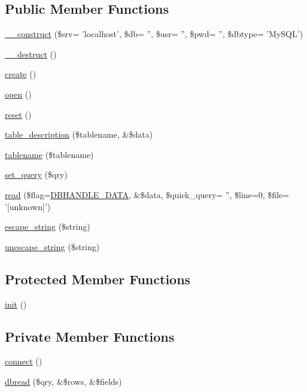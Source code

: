 \subsection*{Public Member Functions}
\begin{CompactItemize}
\item 
\hyperlink{classDbHandler_e54e9d4643f41a9296167086f6a769fc}{\_\-\_\-construct} (\$srv= 'localhost', \$db= '', \$usr= '', \$pwd= '', \$dbtype= 'MySQL')
\item 
\hyperlink{classDbHandler_7cd6bd727d1f296eb5dbfae6ca36ab3f}{\_\-\_\-destruct} ()
\item 
\hyperlink{classDbHandler_c9e93cb0ab57f03b2719eebd0c0ee2ef}{create} ()
\item 
\hyperlink{classDbHandler_fccbfc69ead84f8445116e050d1cfc2d}{open} ()
\item 
\hyperlink{classDbHandler_9982df4830f05803935bb31bac7fae3d}{reset} ()
\item 
\hyperlink{classDbHandler_00402b0e3e677108716714fbf94bea40}{table\_\-description} (\$tablename, \&\$data)
\item 
\hyperlink{classDbHandler_baca15a312800e5522b3efd9dff036f5}{tablename} (\$tablename)
\item 
\hyperlink{classDbHandler_305a3225c4760a88a06b0d55d0893962}{set\_\-query} (\$qry)
\item 
\hyperlink{classDbHandler_5ebfdc2acfcb0e9cbc2861fc55c7127c}{read} (\$flag=\hyperlink{class_8dbhandler_8php_cc5178c2a582eafa4ef488ed3394b725}{DBHANDLE\_\-DATA}, \&\$data, \$quick\_\-query= '', \$line=0, \$file= '\mbox{[}unknown\mbox{]}')
\item 
\hyperlink{classDbHandler_67d77702ff6db70f89123d3f947af143}{escape\_\-string} (\$string)
\item 
\hyperlink{classDbHandler_27c604b14c39913d34630e5504979b15}{unescape\_\-string} (\$string)
\end{CompactItemize}
\subsection*{Protected Member Functions}
\begin{CompactItemize}
\item 
\hyperlink{class__OWL_e0ef3ded56e8a6b34b6461e5a721cd3e}{init} ()
\end{CompactItemize}
\subsection*{Private Member Functions}
\begin{CompactItemize}
\item 
\hyperlink{classDbHandler_9cf52ba614981a0082063d57290d3b7c}{connect} ()
\item 
\hyperlink{classDbHandler_130e49aa639fecb46ce6719ddcb0d72f}{dbread} (\$qry, \&\$rows, \&\$fields)
\end{CompactItemize}
